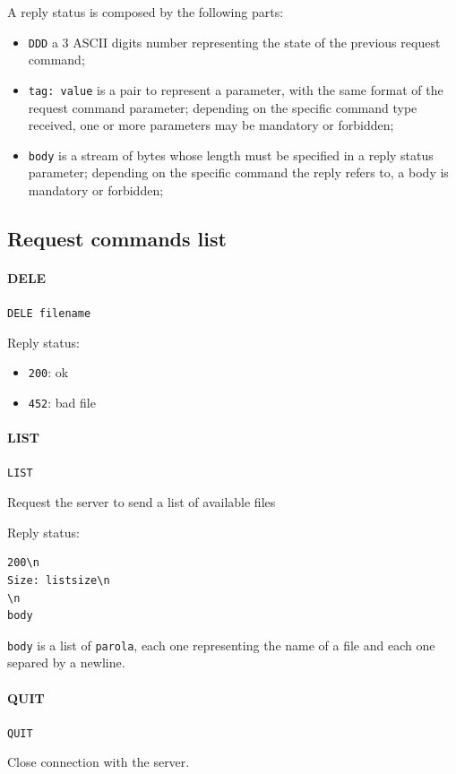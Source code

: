 \documentclass[a4paper,12pt]{article}
\begin{document}
A reply status is composed by the following parts:
\begin{itemize}
  \item \texttt{DDD} a 3 ASCII digits number representing the state of the previous request command;
  \item \texttt{tag: value} is a pair to represent a parameter, with the same format of the request command parameter; depending on the specific command type received, one or more parameters may be mandatory or forbidden;
  \item \texttt{body} is a stream of bytes whose length must be specified in a reply status parameter; depending on the specific command the reply refers to, a body is mandatory or forbidden;
\end{itemize}

\subsection{Request commands list}

\paragraph{DELE}
\texttt{DELE filename}

Reply status:
\begin{itemize}
  \item \texttt{200}: ok
  \item \texttt{452}: bad file
\end{itemize}

\paragraph{LIST}
\texttt{LIST}

Request the server to send a list of available files

Reply status:
\begin{verbatim}
200\n
Size: listsize\n
\n
body
\end{verbatim}

\texttt{body} is a list of \texttt{parola}, each one representing the name of a file and each one separed by a newline.

\paragraph{QUIT}
\texttt{QUIT}

Close connection with the server.
\end{document}
